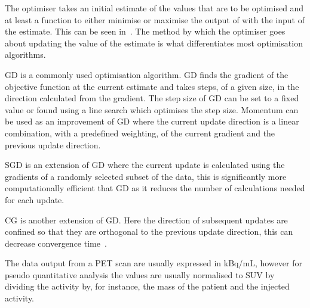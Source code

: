                 The optimiser takes an initial estimate of the values that are to be optimised and at least a function to either minimise or maximise the output of with the input of the estimate. This can be seen in~. The method by which the optimiser goes about updating the value of the estimate is what differentiates most optimisation algorithms.
                
                \gls{GD} is a commonly used optimisation algorithm. \gls{GD} finds the gradient of the objective function at the current estimate %
                and takes steps, of a given size,  in the direction calculated from the gradient. %
                The step size of \gls{GD} can be set to a fixed value or found using a line search which optimises the step size. Momentum can be used as an improvement of \gls{GD} where the current update direction is a linear combination, with a predefined weighting, of the current gradient and the previous update direction. %
                
                \gls{SGD} is an extension of \gls{GD} where the current update is calculated using the gradients of a randomly selected subset of the data, %
                this is significantly more computationally efficient that \gls{GD} as it reduces the number of calculations needed for each update.
                
                \gls{CG} is another extension of \gls{GD}. Here the direction of subsequent updates are confined so that they are orthogonal to the previous update direction, this can decrease convergence time~. %
            
        The data output from a \gls{PET} scan are usually expressed in \gls{kBq/mL}, however for pseudo quantitative analysis the values are usually normalised to \gls{SUV} by dividing the activity by, for instance, the mass of the patient and the injected activity. %
        
